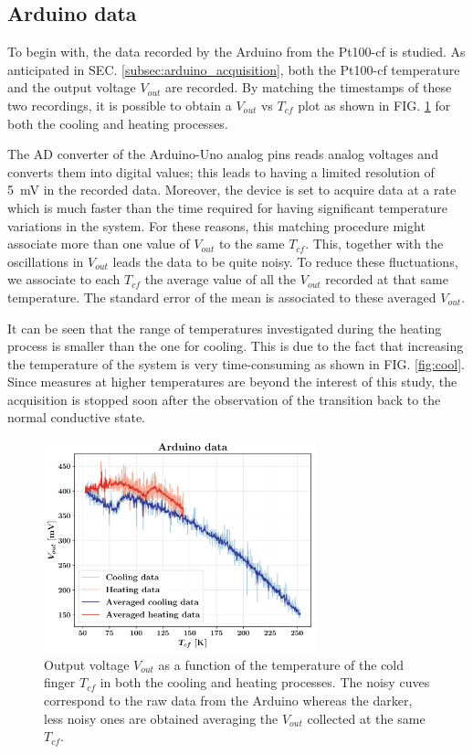 \documentclass[rmp,10pt,onecolumn,fleqn,notitlepage]{revtex4-1}
\begin{document}
\subsection{Arduino data}
\label{subsec:arduino_data}

To begin with, the data recorded by the Arduino from the Pt100-cf is studied. As anticipated in SEC. \ref{subsec:arduino_acquisition}, both the Pt100-cf temperature and the output voltage $V_{out}$ are recorded. By matching the timestamps of these two recordings, it is possible to obtain a $V_{out}$ vs $T_{cf}$ plot as shown in FIG. \ref{fig:ardat} for both the cooling and heating processes. 

The AD converter of the Arduino-Uno analog pins reads analog voltages and converts them into digital values; this leads to having a limited resolution of \SI{5}{\milli \volt} in the recorded data. Moreover, the device is set to acquire data at a rate which is much faster than the time required for having significant temperature variations in the system.
For these reasons, this matching procedure might associate more than one value of $V_{out}$ to the same $T_{cf}$. 
This, together with the oscillations in $V_{out}$ leads the data to be quite noisy. To reduce these fluctuations, we associate to each $T_{cf}$ the average value of all the $V_{out}$ recorded at that same temperature. The standard error of the mean is associated to these averaged $V_{out}$.

It can be seen that the range of temperatures investigated during the heating process is smaller than the one for cooling. This is due to the fact that increasing the temperature of the system is very time-consuming as shown in FIG. \ref{fig:cool}. Since measures at higher temperatures are beyond the interest of this study, the acquisition is stopped soon after the observation of the transition back to the normal conductive state.

\begin{figure}[h!]
    \centering
    \includegraphics[width=0.7\textwidth]{image/arduino_plots/arduino_data.pdf}
    \caption{Output voltage $V_{out}$ as a function of the temperature of the cold finger $T_{cf}$ in both the cooling and heating processes. The noisy cuves correspond to the raw data from the Arduino whereas the darker, less noisy ones are obtained averaging the $V_{out}$ collected at the same $T_{cf}$.}
    \label{fig:ardat}
\end{figure}
\end{document}
